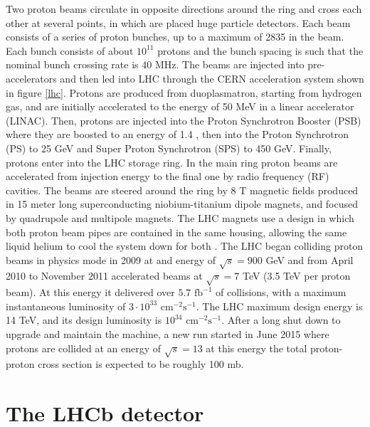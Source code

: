 Two proton beams circulate in opposite directions around the ring and cross each other at several points, 
in which are placed huge particle detectors. Each beam consists of a series of proton bunches, up to a maximum of 2835
in the beam. Each bunch consists of about $10^{11}$ protons and the bunch spacing is such that the nominal bunch crossing
rate is 40 MHz. The beams are injected into pre-accelerators and then led into LHC through the CERN acceleration
system shown in figure \ref{lhc}. Protons are produced from duoplasmatron, starting from hydrogen gas, and are
initially accelerated to the energy of 50 MeV in a linear accelerator (LINAC). Then, protons are injected into
the Proton Synchrotron Booster (PSB) where they are boosted to an energy of 1.4 \gev, then into the Proton Synchrotron (PS)
to 25 GeV and Super Proton Synchrotron (SPS) to 450 GeV. Finally, protons enter into the LHC storage ring.
In the main ring proton beams are accelerated from injection energy to the final one by radio frequency (RF) cavities.
The beams are steered around the ring by 8 T magnetic fields produced in 15 meter long superconducting niobium-titanium
dipole magnets, and focused by quadrupole and multipole magnets. The LHC magnets use a design in which both proton beam
pipes are contained in the same housing, allowing the same liquid helium to cool the system down for both \cite{lhc}.
The LHC began colliding proton beams in physics mode in 2009 at and energy of $\sqrt{s} = 900$ GeV and from April 2010
to November 2011 accelerated beams at $\sqrt{s} = 7$ TeV (3.5 TeV per proton beam). At this energy it delivered over
$5.7 \text{ fb}^{-1}$ of collisions, with a maximum instantaneous luminosity of $3\cdot10^{33} \text{ cm}^{-2}\text{s}^{-1}$.
The LHC maximum design energy is 14 TeV, and its design luminosity is $10^{34} \text{ cm}^{-2}\text{s}^{-1}$.
After a long shut down to upgrade and maintain the machine, a new run started in June 2015 where protons
are collided at an energy of $\sqrt{s} = 13$ \tev at this energy the total proton-proton cross section
is expected to be roughly 100 mb.

\section{The LHCb detector}

